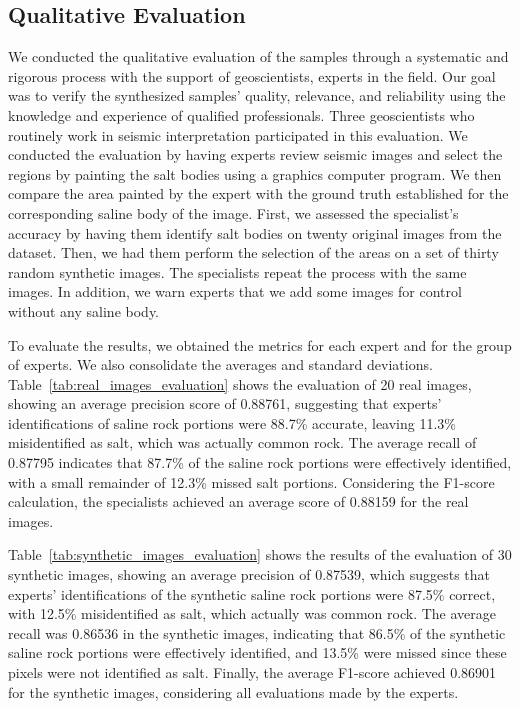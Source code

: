 \documentclass{ieeeaccess}
\begin{document}
\subsection{Qualitative Evaluation}

We conducted the qualitative evaluation of the samples through a systematic and rigorous process with the support of geoscientists, experts in the field. Our goal was to verify the synthesized samples' quality, relevance, and reliability using the knowledge and experience of qualified professionals. Three geoscientists who routinely work in seismic interpretation participated in this evaluation. We conducted the evaluation by having experts review seismic images and select the regions by painting the salt bodies using a graphics computer program. We then compare the area painted by the expert with the ground truth established for the corresponding saline body of the image. First, we assessed the specialist's accuracy by having them identify salt bodies on twenty original images from the dataset. Then, we had them perform the selection of the areas on a set of thirty random synthetic images. The specialists repeat the process with the same images. In addition, we warn experts that we add some images for control without any saline body.

To evaluate the results, we obtained the metrics for each expert and for the group of experts. We also consolidate the averages and standard deviations. Table~\ref{tab:real_images_evaluation} shows the evaluation of 20 real images, showing an average precision score of 0.88761, suggesting that experts' identifications of saline rock portions were 88.7\% accurate, leaving 11.3\% misidentified as salt, which was actually common rock. The average recall of 0.87795 indicates that 87.7\% of the saline rock portions were effectively identified, with a small remainder of 12.3\% missed salt portions. Considering the F1-score calculation, the specialists achieved an average score of 0.88159 for the real images.

Table~\ref{tab:synthetic_images_evaluation} shows the results of the evaluation of 30 synthetic images, showing an average precision of 0.87539, which suggests that experts' identifications of the synthetic saline rock portions were 87.5\% correct, with 12.5\% misidentified as salt, which actually was common rock. The average recall was 0.86536 in the synthetic images, indicating that 86.5\% of the synthetic saline rock portions were effectively identified, and 13.5\% were missed since these pixels were not identified as salt. Finally, the average F1-score achieved 0.86901 for the synthetic images, considering all evaluations made by the experts.
\end{document}
